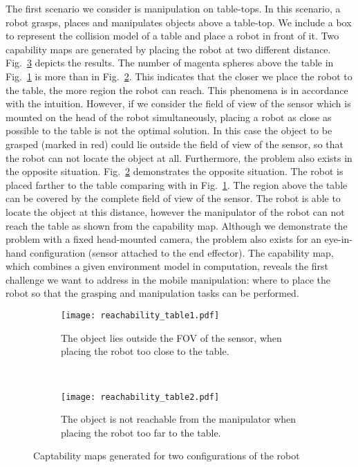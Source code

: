 The first scenario we consider is manipulation on table-tops. In this scenario, a robot grasps, places and manipulates objects above a table-top. We include a box to represent the collision model of a table and place a robot in front of it. Two capability maps are generated by placing the robot at two different distance. Fig.~\ref{fig:cmap_tables} depicts the results. The number of magenta spheres above the table in Fig.~\ref{fig:cmap_table1} is more than in Fig.~\ref{fig:cmap_table2}. This indicates that the closer we place the robot to the table, the more region the robot can reach. This phenomena is in accordance with the intuition. However, if we consider the field of view of the sensor which is mounted on the head of the robot simultaneously, placing a robot as close as possible to the table is not the optimal solution. In this case the object to be grasped (marked in red) could lie outside the field of view of the sensor, so that the robot can not locate the object at all. Furthermore, the problem also exists in the opposite situation. Fig.~\ref{fig:cmap_table2} demonstrates the opposite situation. The robot is placed farther to the table comparing with in Fig.~\ref{fig:cmap_table1}. The region above the table can be covered by the complete field of view of the sensor. The robot is able to locate the object at this distance, however the manipulator of the robot can not reach the table as shown from the capability map. Although we demonstrate the problem with a fixed head-mounted camera, the problem also exists for an eye-in-hand configuration (sensor attached to the end effector). The capability map, which combines a given environment model in computation,  reveals the first challenge we want to address in the mobile manipulation: where to place the robot so that the grasping and manipulation tasks can be performed. 

\begin{figure}[!htbp]
    \centering
    \begin{subfigure}[b]{0.37\textwidth}
        \texttt{[image: reachability\_table1.pdf]}
        \caption{The object lies outside the FOV of the sensor, when placing the robot too close to the table.}
        \label{fig:cmap_table1}
    \end{subfigure}
    ~ %
    \begin{subfigure}[b]{0.45\textwidth}
        \texttt{[image: reachability\_table2.pdf]}
        \caption{The object is not reachable from the manipulator when placing the robot too far to the table.}
        \label{fig:cmap_table2}
    \end{subfigure}
    \caption{Captability maps generated for two configurations of the robot}\label{fig:cmap_tables}
\end{figure}

